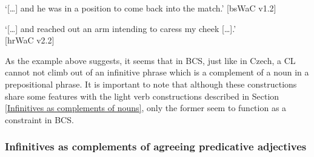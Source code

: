 \begin{exe}\ex\label{(11.23)}
\begin{xlist}
\end{xlist}
\glt ‘[\dots] and he was in a position to come back into the match.’ 
\hfill [bsWaC v1.2]

\ex\label{(11.24)}
\begin{xlist}
\end{xlist}
\glt ‘[\dots] and reached out an arm intending to caress my cheek [\dots].’ \\
\hfill [hrWaC v2.2]
\end{exe}

\noindent As the example above suggests, it seems that in BCS, just like in Czech, a CL cannot not climb out of an infinitive phrase which is a complement of a noun in a prepositional phrase. It is important to note that although these constructions share some features with the light verb constructions described in Section \ref{Infinitives as complements of nouns}, only the former seem to function as a constraint in BCS.

\subsubsection{Infinitives as complements of agreeing predicative adjectives}
\label{Infinitives as complements of agreeing predicative adjectives}

